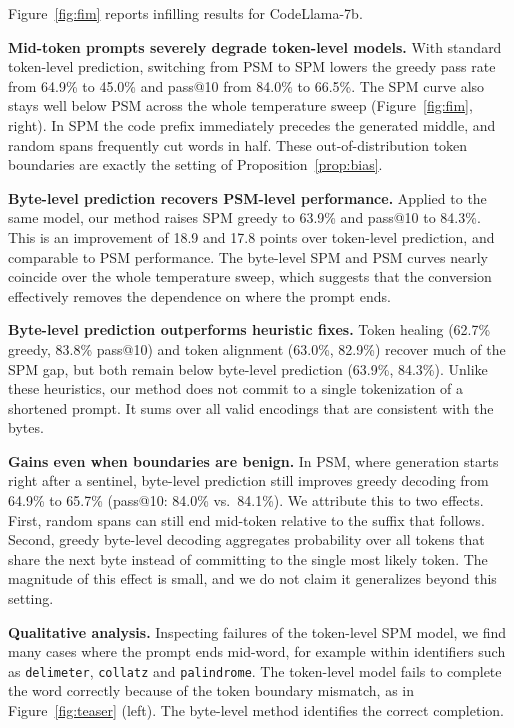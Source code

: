 \documentclass{article} %
\newcommand{\tok}[1]{\texttt{#1}}
\begin{document}
Figure~\ref{fig:fim} reports infilling results for CodeLlama-7b.

\textbf{Mid-token prompts severely degrade token-level models.} With standard token-level prediction, switching from PSM to SPM lowers the greedy pass rate from 64.9\% to 45.0\% and pass@10 from 84.0\% to 66.5\%. The SPM curve also stays well below PSM across the whole temperature sweep (Figure~\ref{fig:fim}, right). In SPM the code prefix immediately precedes the generated middle, and random spans frequently cut words in half. These out-of-distribution token boundaries are exactly the setting of Proposition~\ref{prop:bias}.

\textbf{Byte-level prediction recovers PSM-level performance.} Applied to the same model, our method raises SPM greedy to 63.9\% and pass@10 to 84.3\%. This is an improvement of 18.9 and 17.8 points over token-level prediction, and comparable to PSM performance. The byte-level SPM and PSM curves nearly coincide over the whole temperature sweep, which suggests that the conversion effectively removes the dependence on where the prompt ends.

\textbf{Byte-level prediction outperforms heuristic fixes.} Token healing (62.7\% greedy, 83.8\% pass@10) and token alignment (63.0\%, 82.9\%) recover much of the SPM gap, but both remain below byte-level prediction (63.9\%, 84.3\%). Unlike these heuristics, our method does not commit to a single tokenization of a shortened prompt. It sums over all valid encodings that are consistent with the bytes.

\textbf{Gains even when boundaries are benign.} In PSM, where generation starts right after a sentinel, byte-level prediction still improves greedy decoding from 64.9\% to 65.7\% (pass@10: 84.0\% vs.\ 84.1\%). We attribute this to two effects. First, random spans can still end mid-token relative to the suffix that follows. Second, greedy byte-level decoding aggregates probability over all tokens that share the next byte instead of committing to the single most likely token. The magnitude of this effect is small, and we do not claim it generalizes beyond this setting.

\textbf{Qualitative analysis.} Inspecting failures of the token-level SPM model, we find many cases where the prompt ends mid-word, for example within identifiers such as \tok{delimeter}, \tok{collatz} and \tok{palindrome}. The token-level model fails to complete the word correctly because of the token boundary mismatch, as in Figure~\ref{fig:teaser} (left). The byte-level method identifies the correct completion.
\end{document}
